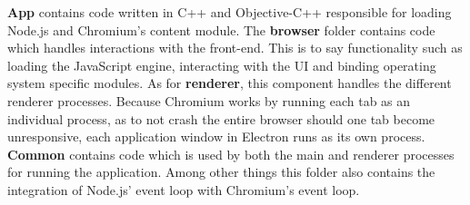\textbf{App} contains code written in C++ and Objective-C++ responsible for loading Node.js and Chromium's content module.
The \textbf{browser} folder contains code which handles interactions with the front-end.
This is to say functionality such as loading the JavaScript engine, interacting with the UI and binding operating system
specific modules.
As for \textbf{renderer}, this component handles the different renderer processes.
Because Chromium works by running each tab as an individual process, as to not crash the entire browser should one
tab become unresponsive, each application window in Electron runs as its own process.
\textbf{Common} contains code which is used by both the main and renderer processes for running the application.
Among other things this folder also contains the integration of Node.js' event loop with Chromium's event loop. \parencite{jensen2017}\paragraph{}
